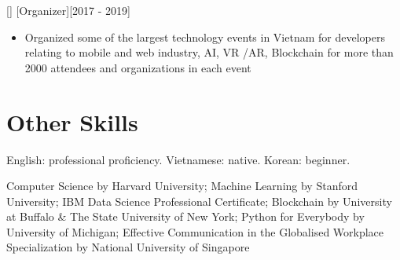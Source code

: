 \documentclass{article}
\begin{document}
[]
[Organizer][2017 - 2019]

\begin{itemize}
\item Organized some of the largest technology events in Vietnam for developers relating to mobile and web
industry, AI, VR /AR, Blockchain for more than 2000 attendees and organizations in each event
\end{itemize}



\section{Other Skills}
\begin{description}[widest=Langauges]
\item[Languages]	English: professional proficiency.  Vietnamese: native.  Korean: beginner.
\item[Online Courses]   Computer Science by Harvard University; Machine Learning by Stanford University; IBM Data Science Professional Certificate; Blockchain by University at Buffalo \& The State University of New York; Python for Everybody by University of Michigan; Effective Communication in the Globalised Workplace Specialization by National University of Singapore
\end{description}
\end{document}
